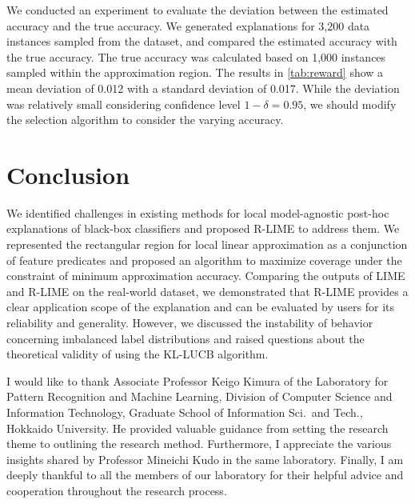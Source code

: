\documentclass[11pt]{article}
\begin{document}
We conducted an experiment to evaluate the deviation
between the estimated accuracy and the true accuracy.
We generated explanations for 3,200 data instances sampled from the dataset,
and compared the estimated accuracy with the true accuracy.
The true accuracy was calculated based on 1,000 instances sampled
within the approximation region.
The results in \cref{tab:reward} show a mean deviation of 0.012
with a standard deviation of 0.017.
While the deviation was relatively small considering confidence level $1-\delta=0.95$,
we should modify the selection algorithm to consider the varying accuracy.

\section{Conclusion}
We identified challenges in existing methods for local model-agnostic post-hoc
explanations of black-box classifiers and proposed R-LIME to address them.
We represented the rectangular region for local linear approximation as a
conjunction of feature predicates and proposed an algorithm to
maximize coverage under the constraint of minimum approximation accuracy.
Comparing the outputs of LIME and R-LIME on the real-world dataset,
we demonstrated that R-LIME provides a clear application scope of the
explanation and can be evaluated by users for its reliability and generality.
However, we discussed the instability of behavior concerning imbalanced label
distributions and raised questions about the theoretical validity of using
the KL-LUCB algorithm.

\ifnum{}
	\acknowledge
	I would like to thank Associate Professor Keigo Kimura
	of the Laboratory for Pattern Recognition and Machine Learning,
	Division of Computer Science and Information Technology,
	Graduate School of Information Sci.\ and Tech., Hokkaido University.
	He provided valuable guidance
	from setting the research theme to outlining the research method.
	Furthermore,
	I appreciate the various insights shared by Professor Mineichi Kudo
	in the same laboratory.
	Finally, I am deeply thankful to all the members of our laboratory
	for their helpful advice and cooperation throughout the research process.
\fi


%
%
%
\ifnum{}
	
\else
	
\fi

%
\end{document}
